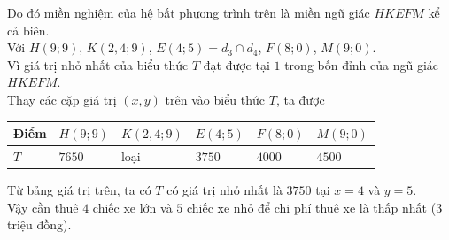 \begin{bt}
{		Do đó miền nghiệm của hệ bất phương trình trên là miền ngũ giác $HKEFM$ kể cả biên.\\
		Với $H(9;9)$, $K(2{,}4;9)$, $E(4;5)=d_3\cap d_4$, $F(8;0)$, $M(9;0)$.\\
		Vì giá trị nhỏ nhất của biểu thức $T$ đạt được tại $1$ trong bốn đỉnh của ngũ giác $HKEFM$.\\
		Thay các cặp giá trị $(x,y)$ trên vào biểu thức $T$, ta được
		\begin{center}
			\begin{tabular}{|>{\centering\arraybackslash}m{2cm}|>{\centering\arraybackslash}m{2cm}|>{\centering\arraybackslash}m{2cm}|>{\centering\arraybackslash}m{2cm}|>{\centering\arraybackslash}m{2cm}|>{\centering\arraybackslash}m{2cm}|}
				\hline
				Điểm&$H(9;9)$&$K(2{,}4;9)$&$E(4;5)$&$F(8;0)$&$M(9;0)$\\
				\hline
				$T$&$7650$&loại&$3750$&$4000$&$4500$\\
				\hline
			\end{tabular}
		\end{center}
		Từ bảng giá trị trên, ta có $T$ có giá trị nhỏ nhất là $3750$ tại $x=4$ và $y=5$.\\
		Vậy cần thuê $4$ chiếc xe lớn và $5$ chiếc xe nhỏ để chi phí thuê xe là thấp nhất ($3$ triệu đồng).
	}
\end{bt}

